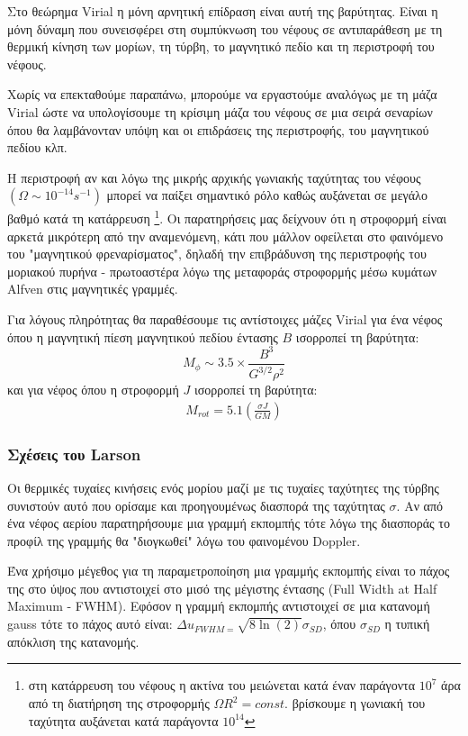 \documentclass[a4paper,12pt]{memoir}
\begin{document}
Στο θεώρημα Virial η μόνη αρνητική επίδραση είναι αυτή της βαρύτητας. Είναι η μόνη δύναμη που συνεισφέρει στη συμπύκνωση του νέφους σε αντιπαράθεση με τη θερμική κίνηση των μορίων, τη τύρβη, το μαγνητικό πεδίο και τη περιστροφή του νέφους.

Χωρίς να επεκταθούμε παραπάνω, μπορούμε να εργαστούμε αναλόγως με τη μάζα Virial ώστε να υπολογίσουμε τη κρίσιμη μάζα του νέφους σε μια σειρά σεναρίων όπου θα λαμβάνονταν υπόψη και οι επιδράσεις της περιστροφής, του μαγνητικού πεδίου κλπ.

Η περιστροφή αν και λόγω της μικρής αρχικής γωνιακής ταχύτητας του νέφους $(\Omega \sim 10^{-14} s^{-1})$ μπορεί να παίξει σημαντικό ρόλο καθώς αυξάνεται σε μεγάλο βαθμό κατά τη κατάρρευση \footnote{στη κατάρρευση του νέφους η ακτίνα του μειώνεται κατά έναν παράγοντα $10^7$ άρα από τη διατήρηση της στροφορμής $\Omega R^2 = const.$ βρίσκουμε η γωνιακή του ταχύτητα αυξάνεται κατά παράγοντα $10^{14}$}. Οι παρατηρήσεις μας δείχνουν ότι η στροφορμή είναι αρκετά μικρότερη από την αναμενόμενη, κάτι που μάλλον οφείλεται στο φαινόμενο του "μαγνητικού φρεναρίσματος", δηλαδή την επιβράδυνση της περιστροφής του μοριακού πυρήνα - πρωτοαστέρα λόγω της μεταφοράς στροφορμής μέσω κυμάτων Alfven στις μαγνητικές γραμμές.

Για λόγους πληρότητας θα παραθέσουμε τις αντίστοιχες μάζες \cite{schulz_2012} Virial για ένα νέφος όπου η μαγνητική πίεση μαγνητικού πεδίου έντασης $B$ ισορροπεί τη βαρύτητα:
\begin{equation}
M_{\phi} \sim 3.5 \times \frac{B^3}{G^{3/2} \rho^2} 
\end{equation}
και για νέφος όπου η στροφορμή $J$ ισορροπεί τη βαρύτητα:
\begin{align}
M_{rot} = 5.1 \left( \frac{\sigma J}{G M} \right) 
\end{align}

\subsubsection{Σχέσεις του Larson}
\label{par:LarsonLaws}
Οι θερμικές τυχαίες κινήσεις ενός μορίου μαζί με τις τυχαίες ταχύτητες της τύρβης συνιστούν αυτό που ορίσαμε και προηγουμένως διασπορά της ταχύτητας $\sigma$. Αν από ένα νέφος αερίου παρατηρήσουμε μια γραμμή εκπομπής τότε λόγω της διασποράς το προφίλ της γραμμής θα "διογκωθεί" λόγω του φαινομένου Doppler. 

Ένα χρήσιμο μέγεθος για τη παραμετροποίηση μια γραμμής εκπομπής είναι το πάχος της στο ύψος που αντιστοιχεί στο μισό της μέγιστης έντασης (Full Width at Half Maximum - FWHM). Εφόσον η γραμμή εκπομπής αντιστοιχεί σε μια κατανομή gauss τότε το πάχος αυτό είναι: $\Delta u _{FWHM = }\sqrt{8 \ln(2)} \sigma _{SD}$, όπου $\sigma _{SD}$ η τυπική απόκλιση της κατανομής. 
\end{document}

